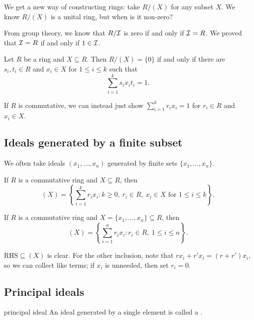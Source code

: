 \documentclass[12pt,letterpaper]{report}
\begin{document}
We get a new way of constructing rings: take $R/(X)$ for any subset $X$.
We know $R/(X)$ is a unital ring, but when is it non-zero?

From group theory, we know that $R/\mathcal{I}$ is zero if and only if $\mathcal{I} = R$.
We proved that $\mathcal{I} = R$ if and only if $1 \in \mathcal{I}$.

\begin{cor}{}{}
  Let $R$ be a ring and $X \subseteq R$.
  Then $R/(X) = \{0\}$ if and only if there are $s_i, t_i \in R$ and $x_i \in X$ for
  $1 \leq i \leq k$ such that
  \[ \sum_{i = 1}^k s_i x_i t_i = 1. \]
\end{cor}

If $R$ is commutative, we can instead just show $\sum_{i = 1}^k r_i x_i = 1$ for $r_i \in R$ and
$x_i \in X$.

\pagebreak
\subsection{Ideals generated by a finite subset}

We often take ideals $(x_1, \ldots, x_n)$ generated by finite sets $\{x_1, \ldots, x_n\}$.

\begin{cor}{}{}
  If $R$ is a commutative ring and $X \subseteq R$, then
  \[
    (X) = \left\{
      \sum_{i = 1}^k r_i x_i : k \geq 0, \ r_i \in R, \ x_i \in X \text{ for } 1 \leq i \leq k
    \right\}.
  \]
\end{cor}

\begin{cor}{}{}
  If $R$ is a commutative ring and $X = \{x_1, \ldots, x_n\} \subseteq R$, then
  \[ (X) = \left\{ \sum_{i = 1}^n r_i x_i : r_i \in R, \ 1 \leq i \leq n \right\}. \]
\end{cor}

\begin{thmproof}
  $\text{RHS} \subseteq (X)$ is clear.
  For the other inclusion, note that $rx_i + r'x_i = (r + r')x_i$, so we can collect like terms;
  if $x_i$ is unneeded, then set $r_i = 0$.
\end{thmproof}

\pagebreak
\subsection{Principal ideals}

\begin{defn}{principal ideal}{}
  An ideal generated by a single element is called a .
\end{defn}
\end{document}
